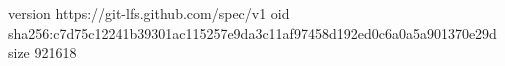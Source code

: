 version https://git-lfs.github.com/spec/v1
oid sha256:c7d75c12241b39301ac115257e9da3c11af97458d192ed0c6a0a5a901370e29d
size 921618
